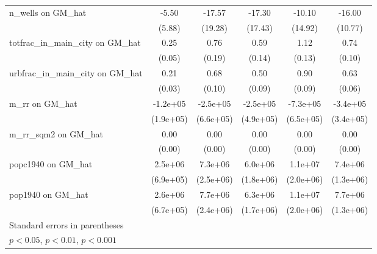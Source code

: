 \begin{table}[htbp]
\begin{tabular}{l*{5}{c}}
\addlinespace
n\_wells on GM\_hat&    -5.50         &   -17.57         &   -17.30         &   -10.10         &   -16.00         \\
                &   (5.88)         &  (19.28)         &  (17.43)         &  (14.92)         &  (10.77)         \\
\addlinespace
totfrac\_in\_main\_city on GM\_hat&     0.25\sym{***}&     0.76\sym{***}&     0.59\sym{***}&     1.12\sym{***}&     0.74\sym{***}\\
                &   (0.05)         &   (0.19)         &   (0.14)         &   (0.13)         &   (0.10)         \\
\addlinespace
urbfrac\_in\_main\_city on GM\_hat&     0.21\sym{***}&     0.68\sym{***}&     0.50\sym{***}&     0.90\sym{***}&     0.63\sym{***}\\
                &   (0.03)         &   (0.10)         &   (0.09)         &   (0.09)         &   (0.06)         \\
\addlinespace
m\_rr on GM\_hat  & -1.2e+05         & -2.5e+05         & -2.5e+05         & -7.3e+05         & -3.4e+05         \\
                &(1.9e+05)         &(6.6e+05)         &(4.9e+05)         &(6.5e+05)         &(3.4e+05)         \\
\addlinespace
m\_rr\_sqm2 on GM\_hat&     0.00\sym{*}  &     0.00         &     0.00\sym{*}  &     0.00\sym{*}  &     0.00\sym{***}\\
                &   (0.00)         &   (0.00)         &   (0.00)         &   (0.00)         &   (0.00)         \\
\addlinespace
popc1940 on GM\_hat&  2.5e+06\sym{***}&  7.3e+06\sym{**} &  6.0e+06\sym{***}&  1.1e+07\sym{***}&  7.4e+06\sym{***}\\
                &(6.9e+05)         &(2.5e+06)         &(1.8e+06)         &(2.0e+06)         &(1.3e+06)         \\
\addlinespace
pop1940 on GM\_hat&  2.6e+06\sym{***}&  7.7e+06\sym{**} &  6.3e+06\sym{***}&  1.1e+07\sym{***}&  7.7e+06\sym{***}\\
                &(6.7e+05)         &(2.4e+06)         &(1.7e+06)         &(2.0e+06)         &(1.3e+06)         \\
\bottomrule
\multicolumn{6}{l}{\footnotesize Standard errors in parentheses}\\
\multicolumn{6}{l}{\footnotesize \sym{*} \(p<0.05\), \sym{**} \(p<0.01\), \sym{***} \(p<0.001\)}\\
\end{tabular}
\end{table}
